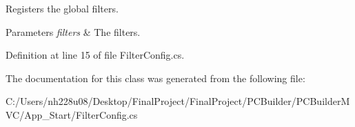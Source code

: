 Registers the global filters. 


\begin{DoxyParams}{Parameters}
{\em filters} & The filters.\\
\hline
\end{DoxyParams}


Definition at line 15 of file Filter\+Config.\+cs.



The documentation for this class was generated from the following file\+:\begin{DoxyCompactItemize}
\item 
C\+:/\+Users/nh228u08/\+Desktop/\+Final\+Project/\+Final\+Project/\+P\+C\+Builder/\+P\+C\+Builder\+M\+V\+C/\+App\+\_\+\+Start/Filter\+Config.\+cs\end{DoxyCompactItemize}
